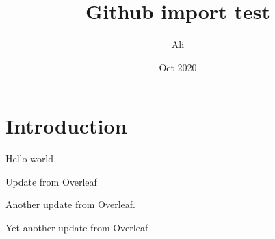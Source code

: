 \documentclass{article}
\title{Github import test}
\author{Ali}
\date{Oct 2020}
\begin{document}
\maketitle

\section{Introduction}

Hello world

Update from Overleaf

Another update from Overleaf.

Yet another update from Overleaf
\end{document}
